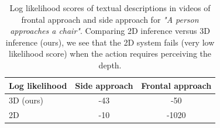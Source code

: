 \documentclass[10pt,twocolumn,letterpaper]{article}
\begin{document}
\begin{table}
\begin{center}
\begin{tabular}{|l|c|c|}
\hline 
 Log likelihood & Side approach & Frontal approach  \\
\hline\hline
3D (ours) & -43 & -50\\
2D \cite{siddharth2014seeing} & -10 & -1020 \\
\hline
\end{tabular}
\end{center}
\caption{Log likelihood scores of textual descriptions in videos of frontal approach and side approach for \textit{
"A person approaches a chair"}. Comparing 2D inference \cite{siddharth2014seeing} versus 3D inference (ours), we see that the 2D system fails (very low likelihood score) when the action requires perceiving the depth.}
\label{table_likelihood}
\end{table}

{\small


}
\end{document}
